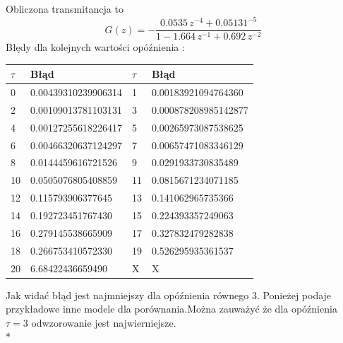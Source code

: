 \documentclass[a4paper, 11pt]{article}
\begin{document}
\begin{enumerate}
Obliczona transmitancja to \[G(z) = -\frac{0.0535\,z^{-4}+0.05131^{-5}}{1-1.664\,z^{-1}+0.692\,z^{-2}}\]
Błędy dla kolejnych wartości opóźnienia : 
\begin{table}[h]
\begin{tabular}{|l|l|l|l|}
\hline
\(\tau\) & Błąd & \(\tau\) & Błąd \\
\hline \hline
0 & 0.00439310239906314   & 1 & 0.00183921094764360  \\
2 & 0.00109013781103131   & 3 & 0.000878208985142877 \\
4 & 0.00127255618226417   & 5 & 0.00265973087538625  \\
6 & 0.00466320637124297   & 7 & 0.00657471083346129  \\
8 & 0.0144459616721526    & 9 & 0.0291933730835489   \\
10 & 0.0505076805408859    & 11 & 0.0815671234071185   \\
12 & 0.115793906377645     & 13 & 0.141062965735366    \\
14 & 0.192723451767430     & 15 & 0.224393357249063    \\
16 & 0.279145538665909     & 17 & 0.327832479282838    \\
18 & 0.266753410572330     & 19 & 0.526295935361537    \\
20 & 6.68422436659490    & X&X\\
\hline
\end{tabular}
\end{table}
\newpage
Jak widać błąd jest najmniejszy dla opóźnienia równego 3.
Ponieżej podaje przykładowe inne modele dla porównania.Można zauważyć że dla opóźnienia \(\tau = 3\) odwzorowanie jest najwierniejsze.\\*


\end{enumerate}
\end{document}
